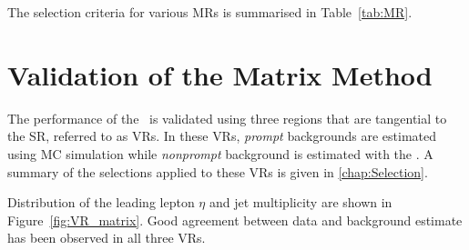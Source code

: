 The selection criteria for various \acp{MR} is summarised in Table~\ref{tab:MR}.

\begin{table}[th]
\sffamily
\centering
\caption{Summary of the selection criteria applied to the measurement regions of $r$ and $f$. ``OffZ'' means events containing two \ac{SS} electrons with an invariant mass between 76 and 106 GeV are removed. $C_i$ denotes the electric charge of the selected lepton.}
\label{tab:MR}
\end{table}

\section{Validation of the Matrix Method}
\label{sec:MMVR}

The performance of the \mm~is validated using three regions that are tangential to the \ac{SR}, referred to as \acp{VR}. In these \acp{VR}, \emph{prompt} backgrounds are estimated using \ac{MC} simulation while \emph{nonprompt} background is estimated with the \mm. A summary of the selections applied to these VRs is given in \autoref{chap:Selection}. 

Distribution of the leading lepton $\eta$ and jet multiplicity are shown in Figure~\ref{fig:VR_matrix}. Good agreement between data and background estimate has been observed in all three \acp{VR}.

